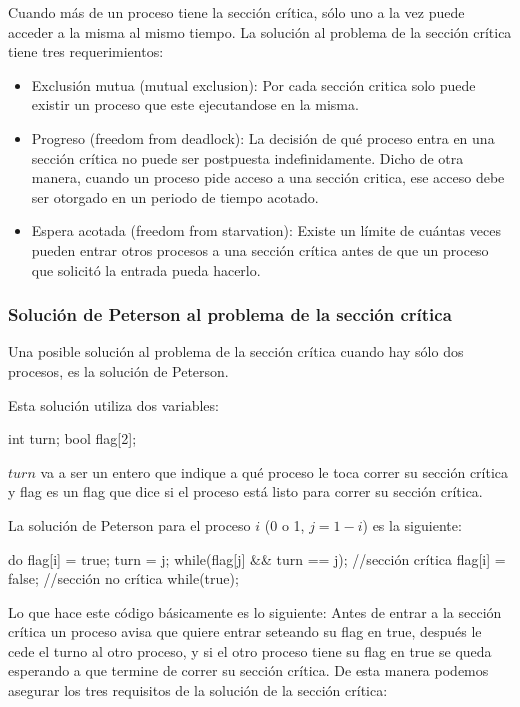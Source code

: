\documentclass{article}
\begin{document}
Cuando m\'as de un proceso tiene la secci\'on cr\'itica, s\'olo uno a la vez puede acceder a la misma al mismo tiempo. La soluci\'on al problema de la secci\'on cr\'itica tiene tres requerimientos:

\begin{itemize}
\item Exclusión mutua (mutual exclusion): Por cada sección critica solo puede existir un proceso que este ejecutandose en la misma.
\item Progreso (freedom from deadlock): La decisi\'on de qu\'e proceso entra en una secci\'on cr\'itica no puede ser postpuesta indefinidamente. Dicho de otra manera, cuando un proceso pide acceso a una sección critica, ese acceso debe ser otorgado en un periodo de tiempo acotado.
\item Espera acotada (freedom from starvation): Existe un l\'imite de cu\'antas veces pueden entrar otros procesos a una sección cr\'itica antes de que un proceso que solicitó la entrada pueda hacerlo.
\end{itemize}

\subsubsection{Soluci\'on de Peterson al problema de la secci\'on cr\'itica}

Una posible soluci\'on al problema de la secci\'on cr\'itica cuando hay s\'olo dos procesos, es la soluci\'on de Peterson.

Esta soluci\'on utiliza dos variables:

\begin{code}
int turn;
bool flag[2];
\end{code}

$turn$ va a ser un entero que indique a qu\'e proceso le toca correr su secci\'on cr\'itica y flag es un flag que dice si el proceso est\'a listo para correr su secci\'on cr\'itica.

La soluci\'on de Peterson para el proceso $i$ (0 o 1, $j = 1-i$) es la siguiente:

\begin{code}
do{
    flag[i] = true;
		turn = j;
		while(flag[j] && turn == j);
		//sección crítica
		flag[i] = false;
		//sección no crítica
}while(true);
\end{code}

Lo que hace este c\'odigo b\'asicamente es lo siguiente: Antes de entrar a la secci\'on cr\'itica un proceso avisa que quiere entrar seteando su flag en true, despu\'es le cede el turno al otro proceso, y si el otro proceso tiene su flag en true se queda esperando a que termine de correr su secci\'on cr\'itica. De esta manera podemos asegurar los tres requisitos de la soluci\'on de la secci\'on cr\'itica:
\end{document}
